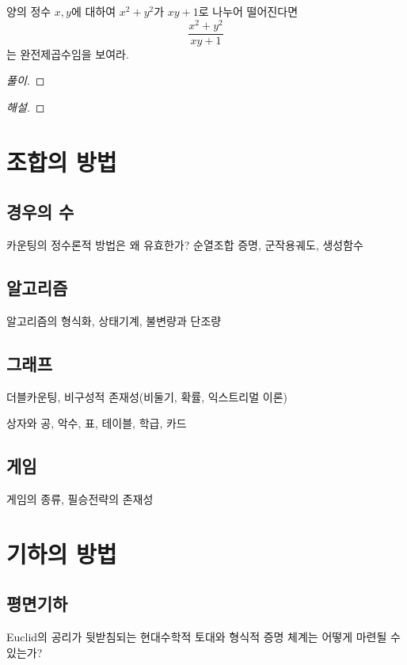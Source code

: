 \documentclass{../../large}
\begin{document}
\begin{example}
양의 정수 $x,y$에 대하여 $x^2+y^2$가 $xy+1$로 나누어 떨어진다면
\[\frac{x^2+y^2}{xy+1}\]
는 완전제곱수임을 보여라.
\end{example}
\begin{linenumbers*}
\begin{proof}[풀이]
\end{proof}
\end{linenumbers*}
\begin{proof}[해설]
\end{proof}





\chapter{조합의 방법}

\section{경우의 수}
카운팅의 정수론적 방법은 왜 유효한가?
순열조합 증명, 군작용궤도, 생성함수
\section{알고리즘}
알고리즘의 형식화, 상태기계, 불변량과 단조량
\section{그래프}
더블카운팅, 비구성적 존재성(비둘기, 확률, 익스트리멀 이론)

상자와 공, 악수, 표, 테이블, 학급, 카드


\section{게임}
게임의 종류,
필승전략의 존재성





\chapter{기하의 방법}

\section{평면기하}

Euclid의 공리가 뒷받침되는 현대수학적 토대와 형식적 증명 체계는 어떻게 마련될 수 있는가?
\end{document}
